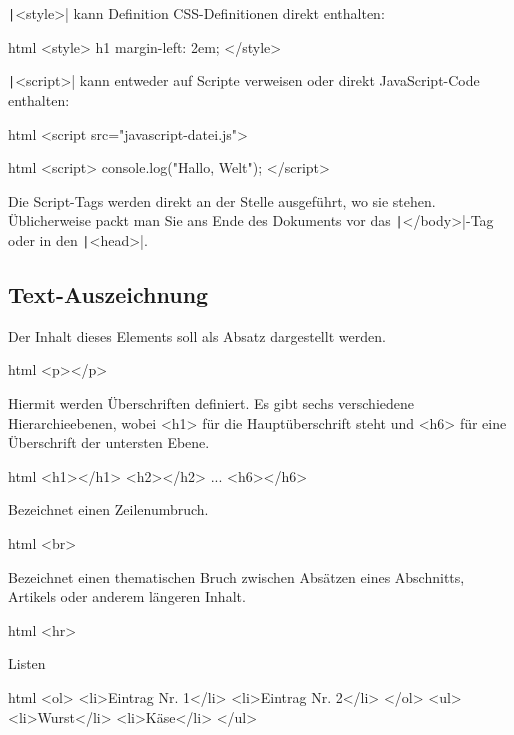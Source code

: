 \documentclass[10pt,a4paper]{article}
\begin{document}
\begin{multicols}{3}
\texttt|<style>| kann Definition CSS-Definitionen direkt enthalten:
\begin{codebox}{html}{}
<style>
h1 {
  margin-left: 2em;
}
</style>
\end{codebox}

\texttt|<script>| kann entweder auf Scripte verweisen oder direkt JavaScript-Code enthalten:

\begin{codebox}{html}{}
<script src="javascript-datei.js">
\end{codebox}

\begin{codebox}{html}{}
<script>
console.log("Hallo, Welt");
</script>
\end{codebox}

Die Script-Tags werden direkt an der Stelle ausgeführt, wo sie stehen. Üblicherweise packt man Sie ans Ende des Dokuments vor das \texttt|</body>|-Tag oder in den \texttt|<head>|.


\subsection*{Text-Auszeichnung}

Der Inhalt dieses Elements soll als Absatz dargestellt werden.
\begin{codebox}{html}{}
<p></p>
\end{codebox}


Hiermit werden Überschriften definiert. Es gibt sechs verschiedene Hierarchieebenen, wobei <h1> für die Hauptüberschrift steht und <h6> für eine Überschrift der untersten Ebene.
\begin{codebox}{html}{}
<h1></h1>
<h2></h2>
...
<h6></h6>
\end{codebox}

Bezeichnet einen Zeilenumbruch.
\begin{codebox}{html}{}
<br>
\end{codebox}

Bezeichnet einen thematischen Bruch zwischen Absätzen eines Abschnitts, Artikels oder anderem längeren Inhalt.
\begin{codebox}{html}{}
<hr>
\end{codebox}

Listen
\begin{codebox}{html}{}
<ol>
  <li>Eintrag Nr. 1</li>
  <li>Eintrag Nr. 2</li>
</ol>
<ul>
  <li>Wurst</li>
  <li>Käse</li>
</ul>
\end{codebox}




\end{multicols}
\end{document}

